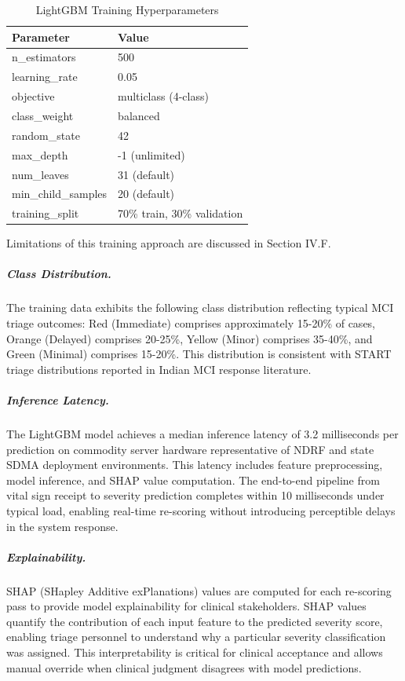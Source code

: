 \documentclass[conference]{IEEEtran}
\begin{document}
\begin{table}[t]
\caption{LightGBM Training Hyperparameters}
\label{tab:lgb_params}
\centering
\begin{tabularx}{\linewidth}{|l|X|}
\hline
\textbf{Parameter} & \textbf{Value} \\
\hline
n\_estimators & 500 \\
learning\_rate & 0.05 \\
objective & multiclass (4-class) \\
class\_weight & balanced \\
random\_state & 42 \\
max\_depth & -1 (unlimited) \\
num\_leaves & 31 (default) \\
min\_child\_samples & 20 (default) \\
training\_split & 70\% train, 30\% validation \\
\hline
\end{tabularx}
\end{table}

Limitations of this training approach are discussed in Section IV.F.

\subparagraph{Class Distribution.}
The training data exhibits the following class distribution reflecting typical MCI triage outcomes: Red (Immediate) comprises approximately 15-20\% of cases, Orange (Delayed) comprises 20-25\%, Yellow (Minor) comprises 35-40\%, and Green (Minimal) comprises 15-20\%. This distribution is consistent with START triage distributions reported in Indian MCI response literature.

\subparagraph{Inference Latency.}
The LightGBM model achieves a median inference latency of 3.2 milliseconds per prediction on commodity server hardware representative of NDRF and state SDMA deployment environments. This latency includes feature preprocessing, model inference, and SHAP value computation. The end-to-end pipeline from vital sign receipt to severity prediction completes within 10 milliseconds under typical load, enabling real-time re-scoring without introducing perceptible delays in the system response.

\subparagraph{Explainability.}
SHAP (SHapley Additive exPlanations) values are computed for each re-scoring pass to provide model explainability for clinical stakeholders. SHAP values quantify the contribution of each input feature to the predicted severity score, enabling triage personnel to understand why a particular severity classification was assigned. This interpretability is critical for clinical acceptance and allows manual override when clinical judgment disagrees with model predictions.
\end{document}
